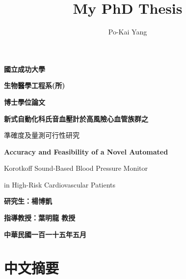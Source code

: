 \documentclass[
  12pt,
  letterpaper,
  openany,
  oneside]{book}
\title{My PhD Thesis}
\author{Po-Kai Yang}
\date{}
\renewcommand{\maketitle}{}
\renewcommand{\mainmatter}{}
\begin{document}
\frontmatter
\maketitle

\thispagestyle{empty}
\begin{center}

{\fontsize{24}{28}\selectfont\bfseries 國立成功大學\par}
\vspace{0.3cm}
{\fontsize{20}{24}\selectfont\bfseries 生物醫學工程系(所)\par}
\vspace{0.3cm}
{\fontsize{20}{24}\selectfont\bfseries 博士學位論文\par}

\vspace{2cm}

{\fontsize{18}{27}\selectfont\bfseries
新式自動化科氏音血壓計於高風險心血管族群之\par
準確度及量測可行性研究\par}

\vspace{1cm}

{\fontsize{16}{24}\selectfont\bfseries
Accuracy and Feasibility of a Novel Automated\par
Korotkoff Sound-Based Blood Pressure Monitor\par
in High-Risk Cardiovascular Patients\par}

\vfill

{\fontsize{16}{24}\selectfont\bfseries 研究生：楊博凱\par}
\vspace{0.4cm}
{\fontsize{16}{24}\selectfont\bfseries 指導教授：葉明龍 教授\par}

\vspace{1.5cm}

{\fontsize{16}{24}\selectfont\bfseries 中華民國一百一十五年五月\par}

\vspace{1cm}

\end{center}
\newpage
\frontmatter
{}
\setcounter{page}{1}


\mainmatter
{}

\chapter*{中文摘要}\label{ux4e2dux6587ux6458ux8981}
\end{document}
